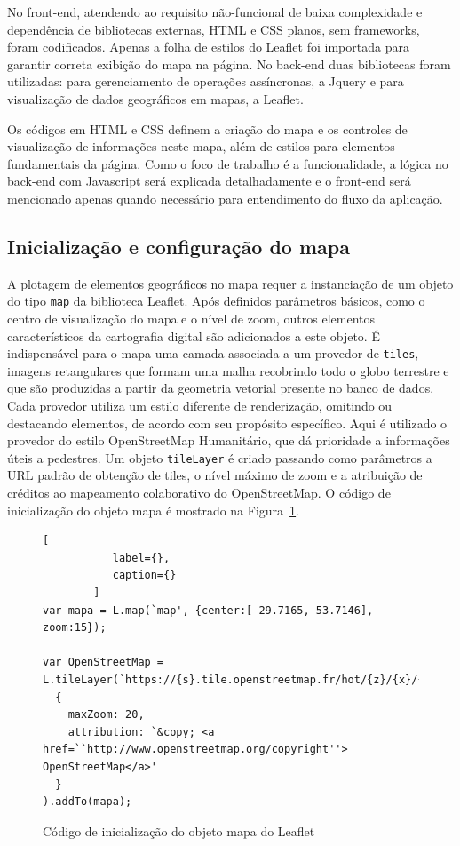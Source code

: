 \documentclass[oneside,openright,12pt]{ufsm_2015} %
\begin{document}
No front-end,  atendendo ao requisito não-funcional de baixa complexidade e dependência de bibliotecas externas, HTML e CSS planos, sem frameworks, foram codificados. Apenas a folha de estilos do Leaflet foi importada para garantir correta exibição do mapa na página. 
No back-end duas bibliotecas foram utilizadas: para gerenciamento de operações assíncronas, a Jquery e para visualização de dados geográficos em mapas, a Leaflet.

Os códigos em HTML e CSS definem a criação do mapa e os controles de visualização de informações neste mapa, além de estilos para elementos fundamentais da página. Como o foco de trabalho é a funcionalidade, a lógica no back-end com Javascript será explicada detalhadamente e o front-end será mencionado apenas quando necessário para entendimento do fluxo da aplicação.

\subsection{Inicialização e configuração do mapa}

A plotagem de elementos geográficos no mapa requer a instanciação de um objeto do tipo {\tt map} da biblioteca Leaflet. 
Após definidos parâmetros básicos, como o centro de visualização do mapa e o nível de zoom, outros elementos característicos da cartografia digital são adicionados a este objeto. 
É indispensável para o mapa uma camada associada a um provedor de {\tt tiles}, imagens retangulares que formam uma malha recobrindo todo o globo terrestre e que são produzidas a partir da geometria vetorial presente no banco de dados. 
Cada provedor utiliza um estilo diferente de renderização, omitindo ou destacando elementos, de acordo com seu propósito específico. 
Aqui é utilizado o provedor do estilo OpenStreetMap Humanitário, que dá prioridade a informações úteis a pedestres. 
Um objeto {\tt tileLayer} é criado passando como parâmetros a URL padrão de obtenção de tiles, o nível máximo de zoom e a atribuição de créditos ao mapeamento colaborativo do OpenStreetMap. O código de inicialização do objeto mapa é mostrado na Figura~\ref{codigo:inicia_mapa}.

\begin{figure}[h!]
    \centering
    \caption{Código de inicialização do objeto mapa do Leaflet}
    \label{codigo:inicia_mapa}
    \begin{lstlisting}[
           label={},
           caption={}
        ]
var mapa = L.map(`map', {center:[-29.7165,-53.7146], zoom:15});

var OpenStreetMap = L.tileLayer(`https://{s}.tile.openstreetmap.fr/hot/{z}/{x}/{y}.png',
  {
    maxZoom: 20,
    attribution: `&copy; <a href=``http://www.openstreetmap.org/copyright''> OpenStreetMap</a>'
  }
).addTo(mapa);
\end{lstlisting}
\end{figure}
\end{document}
